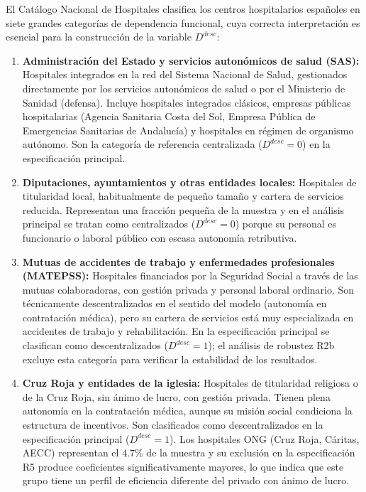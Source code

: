 \documentclass[12pt, a4paper, twoside, openright]{book}
\theoremstyle{plain}
\theoremstyle{definition}
\theoremstyle{remark}
\begin{document}
El Catálogo Nacional de Hospitales clasifica los centros hospitalarios españoles en siete grandes categorías de dependencia funcional, cuya correcta interpretación es esencial para la construcción de la variable $D^{desc}$:

\begin{enumerate}[label=(\roman*)]
  \item \textbf{Administración del Estado y servicios autonómicos de salud (SAS):} Hospitales integrados en la red del Sistema Nacional de Salud, gestionados directamente por los servicios autonómicos de salud o por el Ministerio de Sanidad (defensa). Incluye hospitales integrados clásicos, empresas públicas hospitalarias (Agencia Sanitaria Costa del Sol, Empresa Pública de Emergencias Sanitarias de Andalucía) y hospitales en régimen de organismo autónomo. Son la categoría de referencia centralizada ($D^{desc}=0$) en la especificación principal.

  \item \textbf{Diputaciones, ayuntamientos y otras entidades locales:} Hospitales de titularidad local, habitualmente de pequeño tamaño y cartera de servicios reducida. Representan una fracción pequeña de la muestra y en el análisis principal se tratan como centralizados ($D^{desc}=0$) porque su personal es funcionario o laboral público con escasa autonomía retributiva.

  \item \textbf{Mutuas de accidentes de trabajo y enfermedades profesionales (MATEPSS):} Hospitales financiados por la Seguridad Social a través de las mutuas colaboradoras, con gestión privada y personal laboral ordinario. Son técnicamente descentralizados en el sentido del modelo (autonomía en contratación médica), pero su cartera de servicios está muy especializada en accidentes de trabajo y rehabilitación. En la especificación principal se clasifican como descentralizados ($D^{desc}=1$); el análisis de robustez R2b excluye esta categoría para verificar la estabilidad de los resultados.

  \item \textbf{Cruz Roja y entidades de la iglesia:} Hospitales de titularidad religiosa o de la Cruz Roja, sin ánimo de lucro, con gestión privada. Tienen plena autonomía en la contratación médica, aunque su misión social condiciona la estructura de incentivos. Son clasificados como descentralizados en la especificación principal ($D^{desc}=1$). Los hospitales ONG (Cruz Roja, Cáritas, AECC) representan el 4.7\% de la muestra y su exclusión en la especificación R5 produce coeficientes significativamente mayores, lo que indica que este grupo tiene un perfil de eficiencia diferente del privado con ánimo de lucro.


\end{enumerate}
\end{document}
